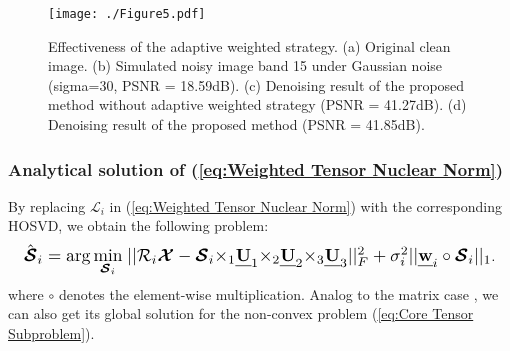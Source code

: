 \documentclass[twocolumn]{svjour3}          %
\begin{document}
\begin{figure}
\begin{center}
    \texttt{[image: ./Figure5.pdf]}
\end{center}
   \caption{Effectiveness of the adaptive weighted strategy. (a) Original clean image. (b) Simulated noisy image band 15 under Gaussian noise (sigma=30, PSNR = 18.59dB). (c) Denoising result of the proposed method without adaptive weighted strategy (PSNR = 41.27dB). (d) Denoising result of the proposed method (PSNR = 41.85dB).}
\label{weighted efectiveness}
\end{figure}

  \subsubsection{Analytical solution of (\ref{eq:Weighted Tensor Nuclear Norm})}

    By replacing ${\boldsymbol{\mathcal{L}}_i}$ in (\ref{eq:Weighted Tensor Nuclear Norm}) with the corresponding HOSVD, we obtain the following problem:
    \begin{equation}\label{eq:Core Tensor Subproblem}
    \begin{aligned}
    \resizebox{0.97\hsize}{!}{${{{\hat{\boldsymbol{\mathcal{S}}}}_i}} = \arg \mathop {\min }\limits_{{{\boldsymbol{\mathcal{S}}}_i}} {\kern 1pt} ||{{\cal R}_i}{\boldsymbol{\mathcal{X}}} - {{\boldsymbol{\mathcal{S}}}_i}{ \times _1}{\textbf{\emph{U}}_1}{ \times _2}{\textbf{\emph{U}}_2}{ \times _3}{\textbf{\emph{U}}_3}||_F^2 + \sigma _i^2||{\textbf{\emph{w}}_i} \circ {{\boldsymbol{\mathcal{S}}}_i}|{|_1}$}.
    \end{aligned}
    \end{equation}
    where $\circ $ denotes the element-wise multiplication. Analog to the matrix case \cite{cai2010singular, Gu2014Weighted}, we can also get its global solution for the non-convex problem (\ref{eq:Core Tensor Subproblem}).
\end{document}
